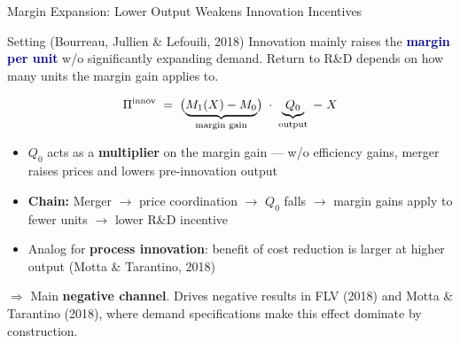 \documentclass[10pt, aspectratio=169]{beamer}
\newcommand{\negg}[1]{\textcolor{softred}{#1}}
\newcommand{\highlight}[1]{\textcolor{darkblue}{\textbf{#1}}}
\begin{document}
\begin{frame}{Margin Expansion: Lower Output Weakens Innovation Incentives}
\small
\begin{block}{\small Setting (Bourreau, Jullien \& Lefouili, 2018)}
\footnotesize Innovation mainly raises the \highlight{margin per unit} w/o significantly expanding demand. Return to R\&D depends on how many units the margin gain applies to.
\end{block}
\vspace{0.15em}
\[
\Pi^{\text{innov}} \;=\; \bigl(\underbrace{M_1(X)-M_0}_{\text{\scriptsize margin gain}}\bigr)\;\cdot\;\underbrace{Q_0}_{\text{\scriptsize output}}\;-\;X
\]
\vspace{0.1em}
\begin{itemize}\setlength{\itemsep}{0.2em}
  \item $Q_0$ acts as a \textbf{multiplier} on the margin gain --- w/o efficiency gains, merger raises prices and lowers pre-innovation output
  \item \textbf{Chain:} Merger $\to$ price coordination $\to$ $Q_0$ \negg{falls} $\to$ margin gains apply to fewer units $\to$ \negg{lower R\&D incentive}
  \item Analog for \textbf{process innovation}: benefit of cost reduction is larger at higher output (Motta \& Tarantino, 2018)
\end{itemize}
\vspace{0.15em}
$\Rightarrow$ Main \textbf{negative channel}. Drives negative results in FLV (2018) and Motta \& Tarantino (2018), where demand specifications make this effect dominate by construction.
\end{frame}
\end{document}
